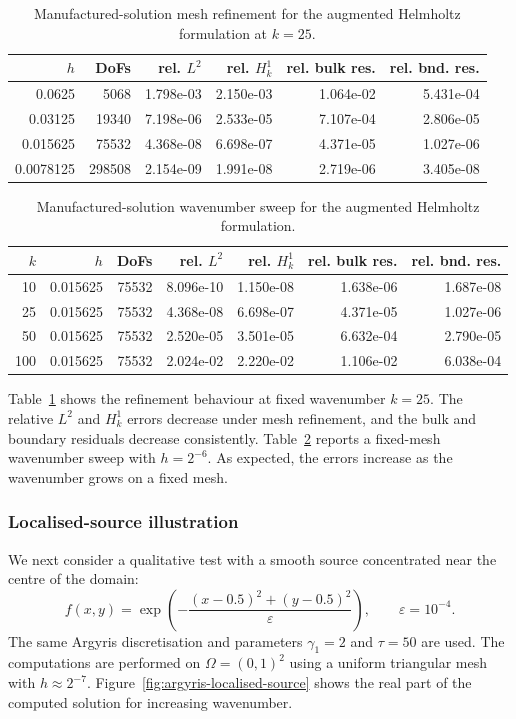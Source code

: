 \documentclass[twoside,11pt]{article}
\newcommand{\qp}[1]{\ensuremath{\!\left({#1}\right)}}
\begin{document}
{\begin{table}[htbp]
\centering
\begin{tabular}{rrrrrr}
\hline
$h$ & DoFs & rel. $L^2$ & rel. $H^1_k$ & rel. bulk res. & rel. bnd. res. \tabularnewline
\hline
0.0625 & 5068 & 1.798e-03 & 2.150e-03 & 1.064e-02 & 5.431e-04 \tabularnewline
0.03125 & 19340 & 7.198e-06 & 2.533e-05 & 7.107e-04 & 2.806e-05 \tabularnewline
0.015625 & 75532 & 4.368e-08 & 6.698e-07 & 4.371e-05 & 1.027e-06 \tabularnewline
0.0078125 & 298508 & 2.154e-09 & 1.991e-08 & 2.719e-06 & 3.405e-08 \tabularnewline
\hline
\end{tabular}
\caption{Manufactured-solution mesh refinement for the augmented Helmholtz formulation at $k=25$.}
\label{tab:fe-mms-refinement}
\end{table}

\begin{table}[htbp]
\centering
\begin{tabular}{rrrrrrr}
\hline
$k$ & $h$ & DoFs & rel. $L^2$ & rel. $H^1_k$ & rel. bulk res. & rel. bnd. res. \\
\hline
10 & 0.015625 & 75532 & 8.096e-10 & 1.150e-08 & 1.638e-06 & 1.687e-08 \\
25 & 0.015625 & 75532 & 4.368e-08 & 6.698e-07 & 4.371e-05 & 1.027e-06 \\
50 & 0.015625 & 75532 & 2.520e-05 & 3.501e-05 & 6.632e-04 & 2.790e-05 \\
100 & 0.015625 & 75532 & 2.024e-02 & 2.220e-02 & 1.106e-02 & 6.038e-04 \\
\hline
\end{tabular}
\caption{Manufactured-solution wavenumber sweep for the augmented Helmholtz formulation.}
\label{tab:fe-mms-k-sweep}
\end{table}

Table~\ref{tab:fe-mms-refinement} shows the refinement behaviour at fixed wavenumber $k=25$. The relative $L^2$ and $H^1_k$ errors decrease under mesh refinement, and the bulk and boundary residuals decrease consistently. Table~\ref{tab:fe-mms-k-sweep} reports a fixed-mesh wavenumber sweep with $h=2^{-6}$. As expected, the errors increase as the wavenumber grows on a fixed mesh.

\subsubsection*{Localised-source illustration}

We next consider a qualitative test with a smooth source concentrated near the centre of the domain:
\begin{equation}
f(x,y)
=
\exp\qp{
-\frac{(x-0.5)^2+(y-0.5)^2}{\varepsilon}
},
\qquad
\varepsilon=10^{-4}.
\end{equation}
The same Argyris discretisation and parameters $\gamma_1=2$ and $\tau=50$ are used. The computations are performed on $\Omega=(0,1)^2$ using a uniform triangular mesh with $h\approx 2^{-7}$. Figure~\ref{fig:argyris-localised-source} shows the real part of the computed solution for increasing wavenumber.

}
\end{document}
